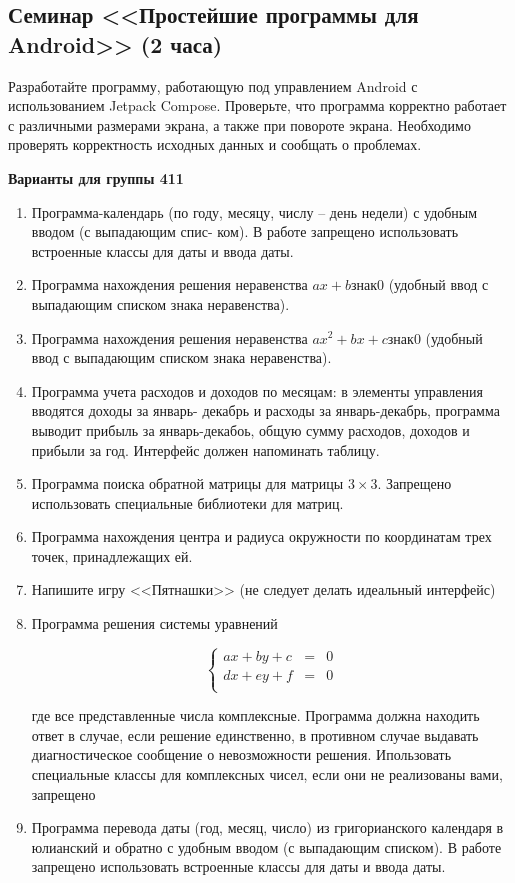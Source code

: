 \subsection{Семинар <<Простейшие программы для Android>> (2 часа)}

Разработайте программу, работающую под управлением Android 
с использованием Jetpack Compose. 
Проверьте, что программа корректно работает с различными размерами экрана,
а также при повороте экрана. Необходимо проверять корректность исходных данных
и сообщать о проблемах.

\textbf{Варианты для группы 411}

\begin{enumerate}
   \item[1] Программа-календарь (по году, месяцу, числу – день недели) с удобным вводом (с выпадающим спис-
ком). В работе запрещено использовать встроенные классы для даты и ввода даты.
\item[2] Программа нахождения решения неравенства $ax + b \textit{знак} 0$ (удобный ввод с выпадающим списком
знака неравенства).
\item[3] Программа нахождения решения неравенства $ax^2 +bx+c \textit{знак} 0$ (удобный ввод с выпадающим списком
знака неравенства).
\item[4] Программа учета расходов и доходов по месяцам: 
в элементы управления вводятся доходы за январь-
декабрь и расходы за январь-декабрь, программа выводит прибыль 
за январь-декабоь, общую сумму
расходов, доходов и прибыли за год. Интерфейс должен напоминать таблицу.

\item[5] Программа поиска обратной матрицы для матрицы $3\times 3$. Запрещено использовать
специальные библиотеки для матриц.
\item[6] Программа нахождения центра и радиуса окружности по координатам трех точек, 
принадлежащих ей.
\item[7] Напишите игру <<Пятнашки>> (не следует делать идеальный интерфейс)
\item[8] Программа решения системы уравнений

$$
\left\{
   \begin{array}{lcl}
ax + by + c &=& 0\\
dx + ey + f &=& 0\\
   \end{array}
\right.
$$

где все представленные числа комплексные. 
Программа должна находить ответ в случае, если решение
единственно, в противном случае выдавать диагностическое сообщение 
о невозможности решения. Ипользовать специальные классы для комплексных чисел, если
они не реализованы вами, запрещено
\item[9] Программа перевода даты (год, месяц, число) 
из григорианского календаря в юлианский и обратно
с удобным вводом (с выпадающим списком). В работе запрещено использовать встроенные классы для даты и ввода даты.


\end{enumerate}
